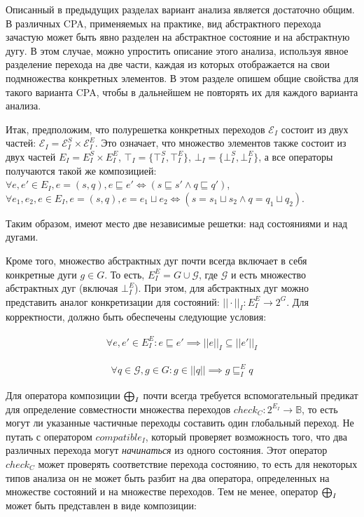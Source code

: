 Описанный в предыдущих разделах вариант анализа является достаточно общим. 
В различных CPA, применяемых на практике, вид абстрактного перехода зачастую может быть явно разделен на абстрактное состояние и на абстрактную дугу.
В этом случае, можно упростить описание этого анализа, используя явное разделение перехода на две части, каждая из которых отображается на свои подмножества конкретных элементов.
В этом разделе опишем общие свойства для такого варианта CPA, чтобы в дальнейшем не повторять их для каждого варианта анализа.

Итак, предположим, что полурешетка конкретных переходов $\mathcal{E}_I$ состоит из двух частей: $\mathcal{E}_I = \mathcal{E}^S_I \times \mathcal{E}^E_I$.
Это означает, что множество элементов также состоит из двух частей $E_I = E^S_I \times E^E_I$, $\top_I = \{\top^S_I, \top^E_I\}$, $\bot_I = \{\bot^S_I, \bot^E_I\}$, а все операторы получаются такой же композицией:\\
$\forall e, e' \in E_I, e = (s, q), e \sqsubseteq e' \iff (s \sqsubseteq s' \land q \sqsubseteq q')$, \\
$\forall e_1, e_2, e \in E_I, e = (s, q), e = e_1 \sqcup e_2 \iff (s = s_1 \sqcup s_2 \land q = q_1 \sqcup q_2)$.

Таким образом, имеют место две независимые решетки: над состояниями и над дугами.

Кроме того, множество абстрактных дуг почти всегда включает в себя конкретные дуги $g \in G$. 
То есть, $E^E_I = G \cup \mathcal{G}$, где $\mathcal{G}$ и есть множество абстрактных дуг (включая $\bot^E_I$).
При этом, для абстрактных дуг можно представить аналог конкретизации для состояний: $||\cdot||_I : E^E_I \to 2^G$.
Для корректности, должно быть обеспечены следующие условия:

\begin{equation}
\label{conc_edge_eq_1}
\begin{aligned}
\forall e, e' \in E^E_I: e \sqsubseteq e' \implies ||e||_I \subseteq ||e'||_I
\end{aligned}
\end{equation}

\begin{equation}
\label{conc_edge_eq_2}
\begin{aligned}
\forall q \in \mathcal{G}, g \in G: g \in ||q|| \implies g \sqsubseteq^E_I q
\end{aligned}
\end{equation}


Для оператора композиции $\mathrel{\bigoplus}_I$ почти всегда требуется вспомогательный предикат для определение совместности множества переходов $check_C: 2^{E_I} \to \mathbb{B}$, то есть могут ли указанные частичные переходы составить один глобальный переход.
Не путать с оператором $compatible_I$, который проверяет возможность того, что два различных перехода могут \textit{начинаться} из одного состояния.
Этот оператор $check_C$ может проверять соответствие перехода состоянию, то есть для некоторых типов анализа он не может быть разбит на два оператора, определенных на множестве состояний и на множестве переходов.
Тем не менее, оператор $\mathrel{\bigoplus}_I$ может быть представлен в виде композиции:

